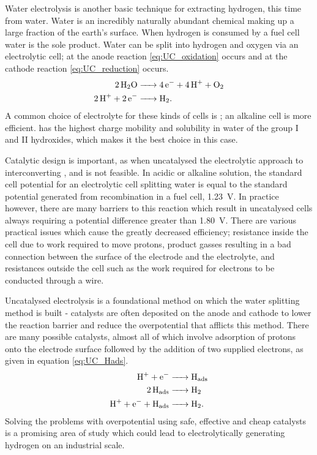 Water electrolysis is another basic technique for extracting hydrogen, this time from water.
Water is an incredibly naturally abundant chemical making up a large fraction of the earth's surface.
When hydrogen is consumed by a fuel cell water is the sole product.
Water can be split into hydrogen and oxygen via an electrolytic cell; at the anode reaction \eqref{eq:UC_oxidation} occurs and at the cathode reaction \eqref{eq:UC_reduction} occurs.
\begin{align}
	\ce{2H2O &-> 4e- + 4H+ + O2} \label{eq:UC_oxidation} \\
	\ce{2H+ + 2e- &-> H2} \label{eq:UC_reduction}
.\end{align}
A common choice of electrolyte for these kinds of cells is ; an alkaline cell is more efficient\cite{merrill2006}.
 has the highest charge mobility and solubility in water of the group I and II hydroxides, which makes it the best choice in this case.

Catalytic design is important, as when uncatalysed the electrolytic approach to interconverting ,  and  is not feasible.
In acidic or alkaline solution, the standard cell potential for an electrolytic cell splitting water is equal to the standard potential generated from recombination in a fuel cell, \SI{1.23}{\volt}\cite{Peng2020}.
In practice however, there are many barriers to this reaction which result in uncatalysed cells always requiring a potential difference greater than \SI{1.80}{\volt}.
There are various practical issues which cause the greatly decreased efficiency; resistance inside the cell due to work required to move protons, product gasses resulting in a bad connection between the surface of the electrode and the electrolyte, and resistances outside the cell such as the work required for electrons to be conducted through a wire.

Uncatalysed electrolysis is a foundational method on which the water splitting method is built - catalysts are often deposited on the anode and cathode to lower the reaction barrier and reduce the overpotential that afflicts this method.
There are many possible catalysts, almost all of which involve adsorption of protons onto the electrode surface followed by the addition of two supplied electrons, as given in equation \eqref{eq:UC_Hads}\cite{Leonard2012}.
\begin{align}
	\ce{H+ + e- &-> H_{ads}}\\
	\ce{2H_{ads} &-> H2}\\
	\ce{H+ + e- + H_{ads} &-> H2} \label{eq:UC_Hads}
.\end{align}
Solving the problems with overpotential using safe, effective and cheap catalysts is a promising area of study which could lead to electrolytically generating hydrogen on an industrial scale.


